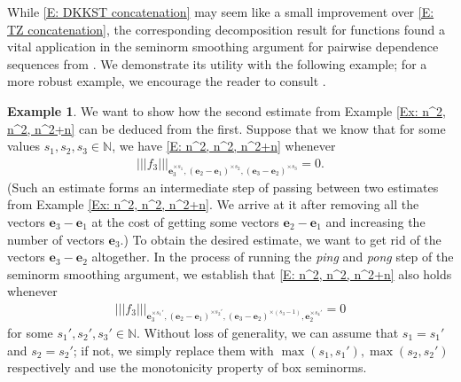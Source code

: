 \documentclass[11pt]{amsart}
\theoremstyle{definition}
\newtheorem{example}[lemma]{Example}
\newcommand{\N}{{\mathbb N}}
\newcommand{\be}{{\mathbf{e}}}
\newcommand{\nnorm}[1]{\lvert\!|\!| #1|\!|\!\rvert}
\newcommand{\1}{{\mathbf{1}}}
\begin{document}
While \eqref{E: DKKST concatenation} may seem like a small improvement over \eqref{E: TZ concatenation}, the corresponding decomposition result for functions found a vital application in the seminorm smoothing argument for pairwise dependence sequences from \cite{DKKST25}. We demonstrate its utility with the following example; for a more robust example, we encourage the reader to consult \cite[Section 4.2]{DKKST25}.
\begin{example}
    We want to show how the second estimate from Example \ref{Ex: n^2, n^2, n^2+n} can be deduced from the first. Suppose that we know that for some values $s_1, s_2, s_3\in\N$, we have \eqref{E: n^2, n^2, n^2+n} whenever 
    \begin{align}\label{E: relative concatenation 1}
        \nnorm{f_3}_{\be_3^{\times s_1}, (\be_2-\be_1)^{\times s_2}, (\be_3-\be_2)^{\times s_3}} = 0.
    \end{align}
    (Such an estimate forms an intermediate step of passing between two estimates from Example \ref{Ex: n^2, n^2, n^2+n}. We arrive at it after removing all the vectors $\be_3-\be_1$ at the cost of getting some vectors $\be_2-\be_1$ and increasing the number of vectors $\be_3$.)
    To obtain the desired estimate, we want to get rid of the vectors $\be_3-\be_2$ altogether. In the process of running the \textit{ping} and \textit{pong} step of the seminorm smoothing argument, we establish that \eqref{E: n^2, n^2, n^2+n} also holds whenever
    \begin{align}\label{E: relative concatenation 2}
        \nnorm{f_3}_{\be_3^{\times s_1'}, (\be_2-\be_1)^{\times s_2'}, (\be_3-\be_2)^{\times (s_3-1)}, \be_2^{\times s_4'}} = 0
    \end{align}
    for some $s_1',s_2',s_3'\in\N$. Without loss of generality, we can assume that $s_1 = s_1'$ and $s_2=s_2'$; if not, we simply replace them with $\max(s_1,s_1'), \max(s_2,s_2')$ respectively and use the monotonicity property of box seminorms. 


\end{example}
\end{document}
